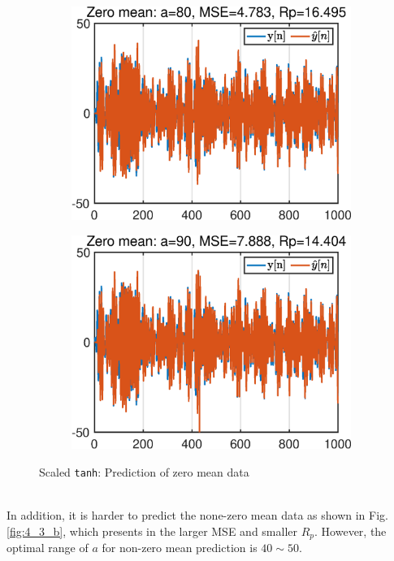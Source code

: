 \begin{figure}[htb]
\begin{subfigure}[b]{0.33\textwidth}
         \includegraphics[width=\textwidth]{fig/4/43a5.eps}
     \end{subfigure}
    \hspace{-0.2cm}
     \begin{subfigure}[b]{0.33\textwidth}
         \centering
         \includegraphics[width=\textwidth]{fig/4/43a6.eps}
     \end{subfigure}
       \caption{Scaled \texttt{tanh}: Prediction of zero mean data}
        \label{fig:4_3_a}
\end{figure}\\
In addition, it is harder to predict the none-zero mean data as shown in Fig.\ref{fig:4_3_b}, which presents in the larger MSE and smaller $R_p$. However, the optimal range of $a$ for non-zero mean prediction is $40\sim 50$.
